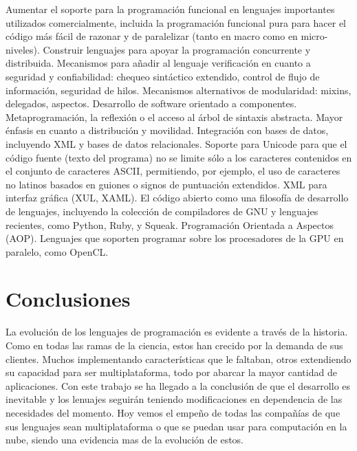 \documentclass[twoside,twocolumn]{article}
\begin{document}
    Aumentar el soporte para la programación funcional en lenguajes importantes utilizados comercialmente, incluida la programación funcional pura para hacer el código más fácil de razonar y de paralelizar (tanto en macro como en micro-niveles).
    Construir lenguajes para apoyar la programación concurrente y distribuida.
    Mecanismos para añadir al lenguaje verificación en cuanto a seguridad y confiabilidad: chequeo sintáctico extendido, control de flujo de información, seguridad de hilos.
    Mecanismos alternativos de modularidad: mixins, delegados, aspectos.
    Desarrollo de software orientado a componentes.
    Metaprogramación, la reflexión o el acceso al árbol de sintaxis abstracta.
    Mayor énfasis en cuanto a distribución y movilidad.
    Integración con bases de datos, incluyendo XML y bases de datos relacionales.
    Soporte para Unicode para que el código fuente (texto del programa) no se limite sólo a los caracteres contenidos en el conjunto de caracteres ASCII, permitiendo, por ejemplo, el uso de caracteres no latinos basados en guiones o signos de puntuación extendidos.
    XML para interfaz gráfica (XUL, XAML).
    El código abierto como una filosofía de desarrollo de lenguajes, incluyendo la colección de compiladores de GNU y lenguajes recientes, como Python, Ruby, y Squeak.
    Programación Orientada a Aspectos (AOP).
    Lenguajes que soporten programar sobre los procesadores de la GPU en paralelo, como OpenCL.

\section{Conclusiones}
La evolución de los lenguajes de programación es evidente a través de la historia. Como en todas las ramas de la ciencia, estos han crecido por la demanda de sus clientes. Muchos implementando características que le faltaban, otros extendiendo su capacidad para ser multiplataforma, todo por abarcar la mayor cantidad de aplicaciones. Con este trabajo se ha llegado a la conclusión de que el desarrollo es inevitable y los lenuajes seguirán teniendo modificaciones en dependencia de las necesidades del momento. Hoy vemos el empeño de todas las compañías de que sus lenguajes sean multiplataforma o que se puedan usar para computación en la nube, siendo una evidencia mas de la evolución de estos.
\end{document}
